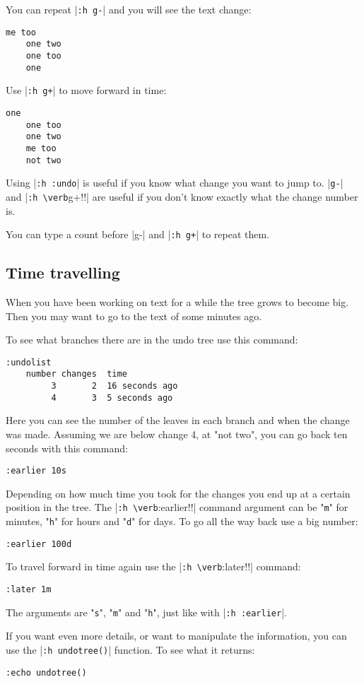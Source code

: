 You can repeat |\verb!:h g-!| and you will see the text change:

\begin{Verbatim}[samepage=true]
    me too 
    one two 
    one too 
    one 
\end{Verbatim}

Use |\verb!:h g+!| to move forward in time:

\begin{Verbatim}[samepage=true]
    one 
    one too 
    one two 
    me too 
    not two 
\end{Verbatim}

Using |\verb!:h :undo!| is useful if you know what change you want to jump to.
|\verb!g-!| and |\verb!:h \verb!g+!!| are useful if you don't know exactly what the change number is.

You can type a count before |g-| and |\verb!:h g+!| to repeat them.
\subsection{Time travelling}
When you have been working on text for a while the tree grows to become big.
Then you may want to go to the text of some minutes ago.

To see what branches there are in the undo tree use this command:

\begin{Verbatim}[samepage=true]
 :undolist
    number changes  time 
         3       2  16 seconds ago
         4       3  5 seconds ago
\end{Verbatim}

Here you can see the number of the leaves in each branch and when the change was made.
Assuming we are below change 4, at "not two", you can go back ten seconds with this command:

\begin{Verbatim}[samepage=true]
 :earlier 10s
\end{Verbatim}

Depending on how much time you took for the changes you end up at a certain position in the tree.
The |\verb!:h \verb!:earlier!!| command argument can be "\verb!m!" for minutes, "\verb!h!" for hours and "\verb!d!" for days.
To go all the way back use a big number:

\begin{Verbatim}[samepage=true]
 :earlier 100d
\end{Verbatim}

To travel forward in time again use the |\verb!:h \verb!:later!!| command:

\begin{Verbatim}[samepage=true]
 :later 1m
\end{Verbatim}

The arguments are "\verb!s!", "\verb!m!" and "\verb!h!", just like with |\verb!:h :earlier!|.

If you want even more details, or want to manipulate the information, you can use the |\verb!:h undotree()!| function.
To see what it returns:

\begin{Verbatim}[samepage=true]
 :echo undotree()
\end{Verbatim}
\clearpage

